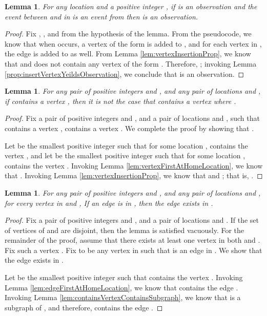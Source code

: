 \documentclass[11pt]{article}
\numberwithin{theorem}{section}
\newtheorem{lemma}[theorem]{Lemma}
\begin{document}
\begin{lemma}\label{lem:insertYeildsObservation}
For any location  and a positive integer , if  is an observation and the event  between  and  in  is an event from   then  is an observation.
\end{lemma}
\begin{proof}
Fix , , and  from the hypothesis of the lemma.
From the pseudocode, we know that when  occurs, a vertex  of the form  is added to , and for each vertex  in , the edge  is added to  as well.
From Lemma \ref{lem:vertexInsertionProp}, we know that  and  does not contain any vertex of the form . 
Therefore, ; invoking Lemma \ref{prop:insertVertexYeildsObservation}, we conclude that  is an observation.
\end{proof}


\begin{lemma} \label{lem:sameIndexSameEvent}
For any pair of positive integers  and , and any pair of locations  and , if  contains a vertex , then it is not the case that  contains a vertex  where .
\end{lemma}
\begin{proof}
Fix a pair of positive integers  and , and a pair of locations  and , such that  contains a vertex ,  contains a vertex . We complete the proof by showing that .

Let  be the smallest positive integer such that for some location ,  contains the vertex , and let  be the smallest positive integer such that for some location ,  contains the vertex . Invoking Lemma \ref{lem:vertexFirstAtHomeLocation}, we know that . Invoking Lemma \ref{lem:vertexInsertionProp}, we know that  and ; that is, .
\end{proof}

\begin{lemma}\label{lem:sameVertexSameIncomingEdges}
For any pair of positive integers  and , and any pair of locations  and , for every vertex  in  and , If an edge  is in , then the edge  exists in .
\end{lemma}
\begin{proof}
Fix a pair of positive integers  and , and a pair of locations  and . If the set of vertices of  and  are disjoint, then the lemma is satisfied vacuously. For the remainder of the proof, assume that there exists at least one vertex in both  and . Fix such a vertex . Fix  to be any vertex in  such that  is an edge in . We show that the edge  exists in .

Let  be the smallest positive integer such that  contains the vertex . Invoking Lemma \ref{lem:edgeFirstAtHomeLocation}, we know that  contains the edge . Invoking Lemma \ref{lem:containsVertexContainsSubgraph}, we know that  is a subgraph of , and therefore,  contains the edge .
\end{proof}
\end{document}
